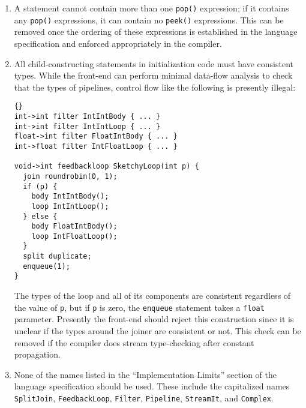 \documentclass[11pt]{article}
\begin{document}
\begin{enumerate}
\item A statement cannot contain more than one \lstinline|pop()|
  expression; if it contains any \lstinline|pop()| expressions, it can
  contain no \lstinline|peek()| expressions.  This can be removed once
  the ordering of these expressions is established in the language
  specification and enforced appropriately in the compiler.
\item All child-constructing statements in initialization code must
  have consistent types.  While the front-end can perform minimal
  data-flow analysis to check that the types of pipelines, control
  flow like the following is presently illegal:

\begin{lstlisting}{}
int->int filter IntIntBody { ... }
int->int filter IntIntLoop { ... }
float->int filter FloatIntBody { ... }
int->float filter IntFloatLoop { ... }

void->int feedbackloop SketchyLoop(int p) {
  join roundrobin(0, 1);
  if (p) {
    body IntIntBody();
    loop IntIntLoop();
  } else {
    body FloatIntBody();
    loop IntFloatLoop();
  }
  split duplicate;
  enqueue(1);
}
\end{lstlisting}

  The types of the loop and all of its components are consistent
  regardless of the value of \lstinline|p|, but if \lstinline|p| is
  zero, the \lstinline|enqueue| statement takes a \lstinline|float|
  parameter.  Presently the front-end should reject this construction
  since it is unclear if the types around the joiner are consistent or
  not.  This check can be removed if the compiler does stream
  type-checking after constant propagation.
\item None of the names listed in the ``Implementation Limits''
  section of the language specification should be used.  These include
  the capitalized names \lstinline|SplitJoin|,
  \lstinline|FeedbackLoop|, \lstinline|Filter|, \lstinline|Pipeline|,
  \lstinline|StreamIt|, and \lstinline|Complex|.
\end{enumerate}
\end{document}
